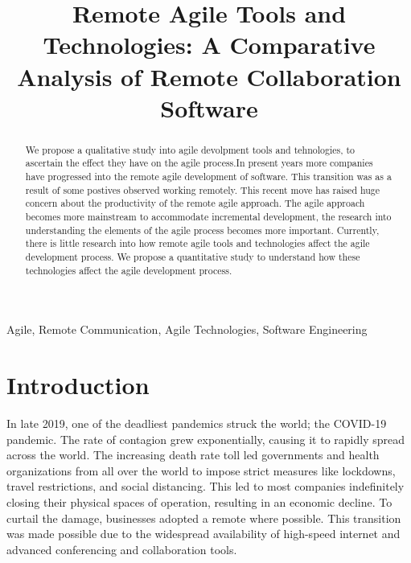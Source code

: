\documentclass[conference]{IEEEtran}
\begin{document}
\title{Remote Agile Tools and Technologies: A Comparative Analysis of Remote Collaboration Software\\
}

\author{

}


\maketitle
\begin{abstract}
    We propose a qualitative study into agile devolpment tools and tehnologies, to ascertain the effect they have on the agile process.In present years more companies have progressed into the remote agile development of software. This transition was as a result of some postives observed working remotely. This recent move has raised huge concern about the productivity of the remote agile approach. The agile approach becomes more mainstream to accommodate incremental development, the research into understanding the elements of the agile process becomes more important. Currently, there is little research into how remote agile tools and technologies affect the agile development process. We propose a quantitative study to understand how these technologies affect the agile development process.
\end{abstract}

\begin{IEEEkeywords}
Agile, Remote Communication, Agile Technologies, Software Engineering
\end{IEEEkeywords}

\section{Introduction}
In late 2019, one of the deadliest pandemics struck the world; the COVID-19 pandemic. The rate of contagion grew exponentially, causing it to rapidly spread across the world. The increasing death rate toll led governments and health organizations from all over the world to impose strict measures like lockdowns, travel restrictions, and social distancing. This led to most companies indefinitely closing their physical spaces of operation, resulting in an economic decline. To curtail the damage, businesses adopted a remote where possible. This transition was made possible due to the widespread availability of high-speed internet and advanced conferencing and collaboration tools.
\end{document}
